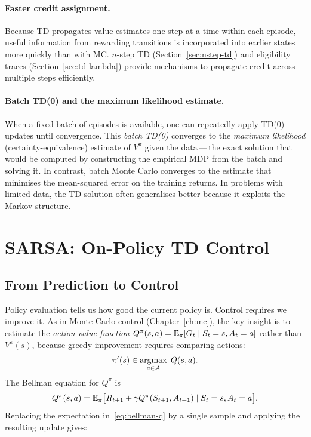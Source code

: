 \paragraph{Faster credit assignment.}
Because TD propagates value estimates one step at a time within each episode, useful information from rewarding transitions is incorporated into earlier states more quickly than with MC.  $n$-step TD (Section~\ref{sec:nstep-td}) and eligibility traces (Section~\ref{sec:td-lambda}) provide mechanisms to propagate credit across multiple steps efficiently.

\paragraph{Batch TD(0) and the maximum likelihood estimate.}
When a fixed batch of episodes is available, one can repeatedly apply TD(0) updates until convergence.  This \emph{batch TD(0)} converges to the \emph{maximum likelihood} (certainty-equivalence) estimate of $V^\pi$ given the data\,---\,the exact solution that would be computed by constructing the empirical MDP from the batch and solving it.  In contrast, batch Monte Carlo converges to the estimate that minimises the mean-squared error on the training returns.  In problems with limited data, the TD solution often generalises better because it exploits the Markov structure.

\section{SARSA: On-Policy TD Control}
\label{sec:sarsa}

\subsection{From Prediction to Control}

Policy evaluation tells us how good the current policy is.  Control requires we improve it.  As in Monte Carlo control (Chapter~\ref{ch:mc}), the key insight is to estimate the \emph{action-value function} $Q^\pi(s,a) = \operatorname{\mathbb{E}}_\pi[G_t \mid S_t=s, A_t=a]$ rather than $V^\pi(s)$, because greedy improvement requires comparing actions:
\[
\pi'(s) \in \operatorname*{argmax}_{a\in\mathcal{A}}\; Q(s,a).
\]
The Bellman equation for $Q^\pi$ is
\begin{equation}
\label{eq:bellman-q}
Q^\pi(s,a) = \operatorname{\mathbb{E}}_\pi\bigl[R_{t+1} + \gamma Q^\pi(S_{t+1},A_{t+1}) \mid S_t=s, A_t=a\bigr].
\end{equation}
Replacing the expectation in~\eqref{eq:bellman-q} by a single sample and applying the resulting update gives:

